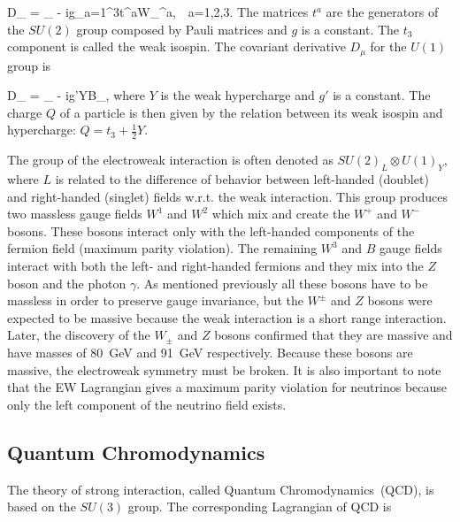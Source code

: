 {
   D_{\mu} = \partial_{\mu} - ig\sum_{a=1}^{3}t^{a}W_{\mu}^{a},~~a=1,2,3.
}
The matrices $t^{a}$ are the generators of the $SU(2)$ group composed by Pauli matrices and $g$ is a constant. The $t_{3}$ component is called the weak isospin. The covariant derivative $D_{\mu}$ for the $U(1)$ group is

{
   D_{\mu} = \partial_{\mu} - ig'YB_{\mu},
}
where $Y$ is the weak hypercharge and $g'$ is a constant. The charge $Q$ of a particle is then given by the relation between its weak isospin and hypercharge: $Q= t_{3} + \frac{1}{2}Y$.


The group of the electroweak interaction is often denoted as $SU(2)_{L} \otimes U(1)_{Y}$, where $L$ is related to the difference of behavior between left-handed (doublet) and right-handed (singlet) fields w.r.t. the weak interaction. This group produces two massless gauge fields $W^{1}$ and $W^2$ which mix and create the $W^{+}$ and $W^{-}$ bosons. These bosons interact only with the left-handed components of the fermion field (maximum parity violation). The remaining $W^{3}$ and $B$ gauge fields interact with both the left- and right-handed fermions and they mix into the $Z$ boson and the photon $\gamma$. As mentioned previously all these bosons have to be massless in order to preserve gauge invariance, but the $W^{\pm}$ and $Z$ bosons were expected to be massive because the weak interaction is a short range interaction. Later, the discovery of the $W_{\pm}$ and $Z$ bosons confirmed that they are massive and have masses of 80~GeV and 91~GeV respectively. Because these bosons are massive, the electroweak symmetry must be broken. It is also important to note that the EW Lagrangian gives a maximum parity violation for neutrinos because only the left component of the neutrino field exists.


\subsection{Quantum Chromodynamics}

The theory of strong interaction, called Quantum Chromodynamics~(QCD), is based on the $SU(3)$ group. The corresponding Lagrangian of QCD is

